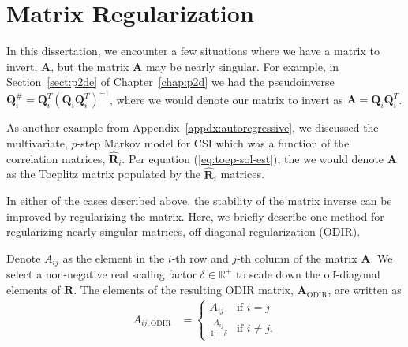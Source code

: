\chapter{Matrix Regularization}
\label{appdx:odir}

In this dissertation, we encounter a few situations where we have a matrix to invert, $\mathbf{A}$, but the matrix $\mathbf{A}$ may be nearly singular. For example, in Section~\ref{sect:p2de} of Chapter~\ref{chap:p2d} we had the pseudoinverse $\mathbf{Q}_i^{\#} = \mathbf{Q}_i^T\left(\mathbf{Q}_i\mathbf{Q}_i^T\right)^{-1}$, where we would denote our matrix to invert as $\mathbf{A}=\mathbf{Q}_i\mathbf{Q}_i^T$.

As another example from Appendix~\ref{appdx:autoregressive}, we discussed the multivariate, $p$-step Markov model for CSI which was a function of the correlation matrices, $\hat{\mathbf{R}}_i$. Per equation (\ref{eq:toep-sol-est}), the we would denote $\mathbf{A}$ as the Toeplitz matrix populated by the $\hat{\mathbf{R}}_i$ matrices.

In either of the cases described above, the stability of the matrix inverse can be improved by regularizing the matrix. Here, we briefly describe one method for regularizing nearly singular matrices, off-diagonal regularization (ODIR).

Denote $A_{ij}$ as the element in the $i$-th row and $j$-th column of the matrix $\mathbf{A}$. We select a non-negative real scaling factor $\delta \in \mathbb{R}^{+}$ to scale down the off-diagonal elements of $\mathbf{R}$. The elements of the resulting ODIR matrix, $\mathbf{A}_{\text{ODIR}}$, are written as
\begin{align}
    A_{ij, \text{ODIR}} &= 
        \begin{cases}
            A_{ij} & \text{if } i = j\\
            \frac{A_{ij}}{1+\delta} & \text{if } i \neq j.
        \end{cases}
\end{align}
